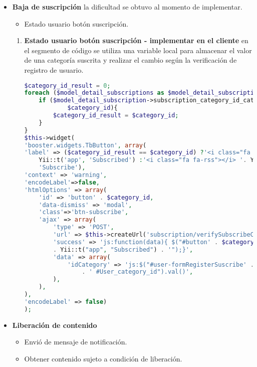 \begin{itemize}
\item \textbf{Baja de suscripción} la dificultad se obtuvo al momento de implementar.
\begin{itemize}
\item Estado usuario botón suscripción.
\end{itemize}
\begin{enumerate}
\item \textbf{Estado usuario botón suscripción - implementar en el cliente}
en el segmento de código se utiliza una variable local para almacenar el valor
de una categoría suscrita y realizar el cambio según la verificación de registro
de usuario.
\begin{lstlisting}[language=PHP, caption={Cambio de estado botón de suscripción.}]
$category_id_result = 0;
foreach ($model_detail_subscriptions as $model_detail_subscription){
    if ($model_detail_subscription->subscription_category_id_category ==
            $category_id){
        $category_id_result = $category_id;
    }
}
$this->widget(
'booster.widgets.TbButton', array(
'label' => ($category_id_result == $category_id) ?'<i class="fa fa-rss"></i> '.
    Yii::t('app', 'Subscribed') :'<i class="fa fa-rss"></i> '. Yii::t('app', 
    'Subscribe'),
'context' => 'warning',
'encodeLabel'=>false,        
'htmlOptions' => array(
    'id' => 'button' . $category_id,
    'data-dismiss' => 'modal',
    'class'=>'btn-subscribe',
    'ajax' => array(
        'type' => 'POST',
        'url' => $this->createUrl('subscription/verifySubscribeCategory'),
        'success' => 'js:function(data){ $("#button' . $category_id . '").html("'
        . Yii::t("app", "Subscribed") . '");}',
        'data' => array(
            'idCategory' => 'js:$("#user-formRegisterSuscribe' . $category_id 
                . ' #User_category_id").val()',
        ),
    ),
),
'encodeLabel' => false)
);
\end{lstlisting}

\end{enumerate}

\item \textbf{Liberación de contenido}

\begin{itemize}

\item Envió de mensaje de notificación.
\item Obtener contenido sujeto a condición de liberación. 

\end{itemize}


\end{itemize}
